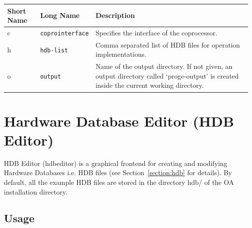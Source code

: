 \documentclass[a4paper,twoside]{tceusermanual}
\begin{document}
\begin{center}
\begin{longtable}[htb]{@{}p{}@{}p{}%
                     @{}p{}}

\textbf{Short Name} &\textbf{Long Name} &\textbf{Description} \\
\hline

c & \verb|coprointerface| &
Specifies the interface of the coprocessor. \\

h & \verb|hdb-list| &
Comma separated list of HDB files for operation implementations.\\

o & \verb|output| &
Name of the output directory. If not given, an output directory called
`proge-output' is created inside the current working directory.
\\
\end{longtable}
\end{center}



\section{Hardware Database Editor (HDB Editor)}
\label{sec:hdbedit}
 

HDB Editor (hdbeditor) is a graphical frontend for creating and
modifying Hardware Databases i.e. HDB files (see Section~\ref{section:hdb}
for details). By default, all the example HDB files are stored in the directory
hdb/ of the OA installation directory.

\subsection{Usage}
\end{document}
